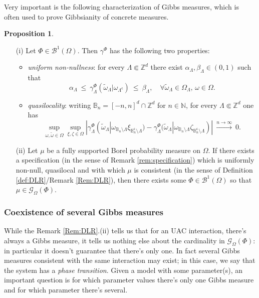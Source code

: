 \documentclass[12pt]{article}
\newcommand{\BB}{\mathscr{B}}
\newcommand{\BBB}{\mathbb{B}}
\newcommand{\G}{\mathcal{G}}
\newcommand{\N}{\mathbb{N}}
\newcommand{\Z}{\mathbb{Z}}
\newcommand{\ra}{\rightarrow}
\newcommand{\1}{\mathbbm{1}}
\renewcommand{\c}{\mathsf{c}}
\newcommand{\5}{\vspace{0.5cm}}
\renewcommand{\tilde}{\widetilde}
\theoremstyle{definition}
\newtheorem{prop}[thm]{Proposition}
\begin{document}
Very important is the following characterization of Gibbs measures, which is often used to prove Gibbsianity of concrete measures.
\begin{prop}\label{DLR:equiv}
~
\begin{itemize}
	\item[(i)] Let $\Phi\in\BB^1(\Omega)$. Then $\gamma^\Phi$ has the following two properties:
		\begin{itemize}
			\item \textit{uniform non-nullness}: for every $\Lambda\Subset\Z^d$ there exist $\alpha_\Lambda,\beta_\Lambda\in(0,1)$ such that
			$$\alpha_\Lambda ~\leq~ \gamma_\Lambda^\Phi(\tilde{\omega}_\Lambda|\omega_{\Lambda^\c}) ~\leq~ \beta_\Lambda, \quad\forall\tilde{\omega}_\Lambda\in\Omega_\Lambda,\,\omega\in\Omega.$$
			\item \textit{quasilocality}: writing $\BBB_n=[-n,n]^d\cap\Z^d$ for $n\in\N$, for every $\Lambda\Subset\Z^d$ one has
			$$\sup_{\omega,\tilde{\omega}\in\Omega}\sup_{\xi,\zeta\in\Omega}|\gamma_\Lambda^\Phi(\tilde{\omega}_\Lambda|\omega_{\BBB_n\setminus\Lambda}\xi_{\BBB_n^\c\setminus\Lambda})-\gamma_\Lambda^\Phi(\tilde{\omega}_\Lambda|\omega_{\BBB_n\setminus\Lambda}\zeta_{\BBB_n^\c\setminus\Lambda})| ~\xrightarrow{n\ra\infty}~ 0.$$
		\end{itemize}
		\item[(ii)] Let $\mu$ be a fully supported Borel probability measure on $\Omega$. If there exists a specification (in the sense of Remark \ref{rem:specification}) which is uniformly non-null, quasilocal and with which $\mu$ is consistent (in the sense of Definition \ref{def:DLR}/Remark \ref{Rem:DLR}), then there exists some $\Phi\in\BB^1(\Omega)$ so that $\mu\in\G_\Omega(\Phi)$.
		
\end{itemize}
\end{prop}


\subsubsection{Coexistence of several Gibbs measures}

While the Remark \ref{Rem:DLR}.(ii) tells us that for an UAC interaction, there's always a Gibbs measure, it tells us nothing else about the cardinality in $\G_\Omega(\Phi)$: in particular it doesn't guarantee that there's only one. In fact several Gibbs measures consistent with the same interaction may exist; in this case, we say that the system has a \textit{phase transition}. Given a model with some parameter(s), an important question is for which parameter values there's only one Gibbs measure and for which parameter there's several. \\
\end{document}
